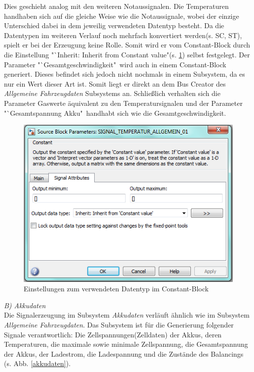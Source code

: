 \documentclass[fontsize = 12pt, paper = a4]{scrreprt}
\begin{document}
\newpage

Dies geschieht analog mit den weiteren Notaussignalen. Die Temperaturen handhaben sich auf die gleiche Weise wie die Notaussignale, wobei der einzige Unterschied dabei in dem jeweilig verwendeten Datentyp besteht. Da die Datentypen im weiteren Verlauf noch mehrfach konvertiert werden(s. SC, ST), spielt er bei der Erzeugung keine Rolle. Somit wird er vom Constant-Block durch die Einstellung "`Inherit: Inherit from Constant value"(s. \ref{constdatentyp}) selbst festgelegt. Der Parameter "`Gesamtgeschwindigkeit"\ wird auch in einem Constant-Block generiert. Dieses befindet sich jedoch nicht nochmals in einem Subsystem, da es nur ein Wert dieser Art ist. Somit liegt er direkt an dem Bus Creator des \textit{Allgemeine Fahrzeugdaten} Subsystems an. Schließlich verhalten sich die Parameter Gaswerte äquivalent zu den Temperatursignalen und der Parameter  "`Gesamtspannung Akku"\ handhabt sich wie die Gesamtgeschwindigkeit.


\begin{figure}[h]
\centering
\includegraphics[scale = 0.8]{const_datentyp}
\caption[Enstellungen zum Datentyp im Constant-Block ]{Einstellungen zum verwendeten Datentyp im Constant-Block}
\label{constdatentyp}
\end{figure}

\textit{B) Akkudaten} \\

Die Signalerzeugung im Subsystem \textit{Akkudaten} verläuft ähnlich wie im Subsystem \textit{Allgemeine Fahrzeugdaten}. Das Subsystem ist für die Generierung folgender Signale verantwortlich: Die Zellspannungen(Zelldaten) der Akkus, deren Temperaturen, die maximale sowie minimale Zellspannung, die Gesamtspannung der Akkus, der Ladestrom, die Ladespannung und die Zustände des Balancings (s. Abb. \ref{akkudaten}). \\
\end{document}
